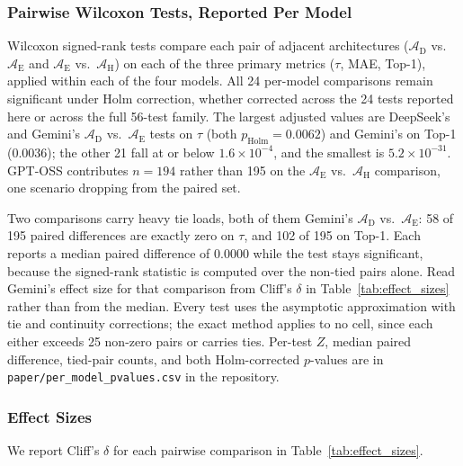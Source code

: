 \documentclass[11pt]{article}
\begin{document}
\subsubsection{Pairwise Wilcoxon Tests, Reported Per Model}

Wilcoxon signed-rank tests compare each pair of adjacent architectures ($\mathcal{A}_{\text{D}}$ vs.\ $\mathcal{A}_{\text{E}}$ and $\mathcal{A}_{\text{E}}$ vs.\ $\mathcal{A}_{\text{H}}$) on each of the three primary metrics ($\tau$, MAE, Top-1), applied within each of the four models. All 24 per-model comparisons remain significant under Holm correction, whether corrected across the 24 tests reported here or across the full 56-test family. The largest adjusted values are DeepSeek's and Gemini's $\mathcal{A}_{\text{D}}$ vs.\ $\mathcal{A}_{\text{E}}$ tests on $\tau$ (both $p_{\mathrm{Holm}} = 0.0062$) and Gemini's on Top-1 ($0.0036$); the other 21 fall at or below $1.6 \times 10^{-4}$, and the smallest is $5.2 \times 10^{-31}$. GPT-OSS contributes $n = 194$ rather than 195 on the $\mathcal{A}_{\text{E}}$ vs.\ $\mathcal{A}_{\text{H}}$ comparison, one scenario dropping from the paired set.

Two comparisons carry heavy tie loads, both of them Gemini's $\mathcal{A}_{\text{D}}$ vs.\ $\mathcal{A}_{\text{E}}$: 58 of 195 paired differences are exactly zero on $\tau$, and 102 of 195 on Top-1. Each reports a median paired difference of 0.0000 while the test stays significant, because the signed-rank statistic is computed over the non-tied pairs alone. Read Gemini's effect size for that comparison from Cliff's $\delta$ in Table~\ref{tab:effect_sizes} rather than from the median. Every test uses the asymptotic approximation with tie and continuity corrections; the exact method applies to no cell, since each either exceeds 25 non-zero pairs or carries ties. Per-test $Z$, median paired difference, tied-pair counts, and both Holm-corrected $p$-values are in \texttt{paper/per\_model\_pvalues.csv} in the repository.

\subsubsection{Effect Sizes}

We report Cliff's $\delta$ for each pairwise comparison in Table~\ref{tab:effect_sizes}.
\end{document}
